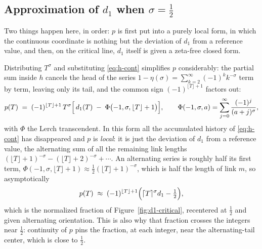 \documentclass[11pt]{article}
\theoremstyle{definition}
\begin{document}
\subsection{Approximation of \texorpdfstring{$d_1$}{d1} when \texorpdfstring{$\sigma=\tfrac12$}{sigma=1/2}}\label{sec:d1-approx-critical}

Two things happen here, in order: $p$ is first put into a purely local form, in
which the continuous coordinate is nothing but the deviation of $d_1$ from a
reference value, and then, on the critical line, $d_1$ itself is given a
zeta-free closed form.

Distributing $T^{\sigma}$ and substituting \eqref{eq:h-cont} simplifies $p$
considerably: the partial sum inside $h$ cancels the head of the series
$1-\eta(\sigma)=\sum_{k=2}^{\infty}(-1)^{k}k^{-\sigma}$ term by term, leaving
only its tail, and the common sign $(-1)^{\lfloor T\rfloor+1}$ factors out:
\begin{equation}\label{eq:p-simplified}
p(T) \;=\; (-1)^{\lfloor T\rfloor+1}\, T^{\sigma}
\Bigl[\, d_1(T) \;-\; \Phi\bigl(-1,\sigma,\lfloor T\rfloor+1\bigr) \Bigr],
\qquad
\Phi(-1,\sigma,a) = \sum_{j=0}^{\infty} \frac{(-1)^{j}}{(a+j)^{\sigma}},
\end{equation}
with $\Phi$ the Lerch transcendent. In this form all the accumulated history
of \eqref{eq:h-cont} has disappeared and $p$ is \emph{local}: it is just the
deviation of $d_1$ from a reference value, the alternating sum of all the
remaining link lengths
$(\lfloor T\rfloor+1)^{-\sigma}-(\lfloor T\rfloor+2)^{-\sigma}+\cdots$.
An alternating series is roughly half its first term,
$\Phi(-1,\sigma,\lfloor T\rfloor+1)\approx\tfrac12(\lfloor T\rfloor+1)^{-\sigma}$,
which is half the length of link $m$, so asymptotically
\[
p(T) \;\approx\; (-1)^{\lfloor T\rfloor+1}
\Bigl( \lceil T\rceil^{\sigma} d_1 - \tfrac12 \Bigr),
\]
which is the normalized fraction of Figure~\ref{fig:d1-critical}, recentered
at $\tfrac12$ and given alternating orientation. This is also why that fraction
crosses the integers near $\tfrac12$: continuity of $p$ pins the fraction, at
each integer, near the alternating-tail center, which is close to $\tfrac12$.
\end{document}
